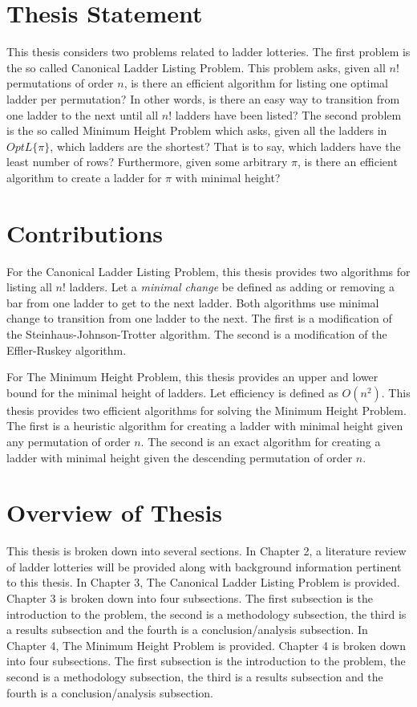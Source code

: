 \section{Thesis Statement}
  	This thesis considers two problems related 
    to ladder lotteries. The first problem is the so called Canonical Ladder Listing Problem. 
	This problem asks, given all $n!$ permutations of order $n$, is there an efficient algorithm for listing 
	one optimal ladder per permutation? In other words, 
	is there an easy way to transition from one ladder to the next until all $n!$ ladders 
	have been listed?
	The second problem is the so called Minimum Height 
    Problem which asks, given all the ladders in $OptL\{\pi\}$, which ladders are 
    the shortest? That is to say, which ladders have the least number of rows? Furthermore, given some arbitrary $\pi$, 
	is there an efficient algorithm to create a ladder for $\pi$ with minimal height? 

\section{Contributions}
	For the Canonical Ladder Listing Problem, this thesis provides 
	two algorithms for listing all $n!$ ladders. 
	Let a \emph{minimal change} be defined as adding or removing a bar from one ladder to get to the 
	next ladder. Both algorithms use minimal change to transition from one ladder to the next. 
	The first is a modification of the Steinhaus-Johnson-Trotter algorithm. The second is a modification of the Effler-Ruskey algorithm.

	For The Minimum Height Problem, this thesis provides an upper and lower bound for the minimal height of ladders. 
	Let efficiency is defined as 
	$O(n^{2})$. This thesis provides two efficient algorithms for solving the Minimum Height Problem. The first is a heuristic algorithm 
	for creating a ladder with minimal height given any permutation of order $n$. 
	The second is an exact algorithm for creating a ladder with minimal height given the descending permutation 
	of order $n$.
	
\section{Overview of Thesis}
This thesis is broken down into several sections. In Chapter 2, a literature
review of ladder lotteries will be provided along with background information pertinent to this thesis. 
In Chapter 3, The Canonical Ladder Listing Problem is provided. 
Chapter 3 is broken down into four subsections. The first subsection is the introduction to the problem, 
the second is a methodology subsection, the third is a results 
subsection and the fourth is a conclusion/analysis subsection. 
In Chapter 4, The Minimum Height Problem is provided. Chapter 4 is broken down into four subsections.
The first subsection is the introduction to the problem, 
the second is a methodology subsection, the third is a results 
subsection and the fourth is a conclusion/analysis subsection. 

